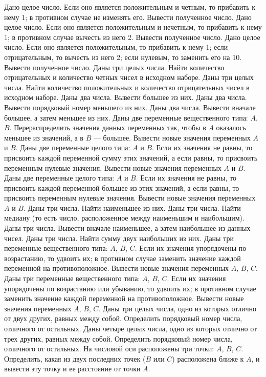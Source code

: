 Дано целое число. Если оно является положительным и четным, то прибавить к нему 1; в противном случае не изменять его. Вывести полученное число.
Дано целое число. Если оно является положительным и нечетным, то прибавить к нему 1; в противном случае вычесть из него 2. Вывести полученное число.
Дано целое число. Если оно является положительным, то прибавить к нему 1; если отрицательным, то вычесть из него 2; если нулевым, то заменить его на 10. Вывести полученное число.
Даны три целых числа. Найти количество отрицательных и количество четных чисел в исходном наборе.
Даны три целых числа. Найти количество положительных и количество отрицательных чисел в исходном наборе.
Даны два числа. Вывести большее из них.
Даны два числа. Вывести порядковый номер меньшего из них.
Даны два числа. Вывести вначале большее, а затем меньшее из них.
Даны две переменные вещественного типа: $A$, $B$. Перераспределить значения данных переменных так, чтобы в $A$ оказалось меньшее из значений, а в $B$ --- большее. Вывести новые значения переменных $A$ и $B$.
Даны две переменные целого типа: $A$ и $B$. Если их значения не равны, то присвоить каждой переменной сумму этих значений, а если равны, то присвоить переменным нулевые значения. Вывести новые значения переменных $A$ и $B$.
Даны две переменные целого типа: $A$ и $B$. Если их значения не равны, то присвоить каждой переменной большее из этих значений, а если равны, то присвоить переменным нулевые значения. Вывести новые значения переменных $A$ и $B$.
Даны три числа. Найти наименьшее из них.
Даны три числа. Найти медиану (то есть число, расположенное между наименьшим и наибольшим).
Даны три числа. Вывести вначале наименьшее, а затем наибольшее из данных чисел.
Даны три числа. Найти сумму двух наибольших из них.
Даны три переменные вещественного типа: $A$, $B$, $C$. Если их значения упорядочены по возрастанию, то удвоить их; в противном случае заменить значение каждой переменной на противоположное. Вывести новые значения переменных $A$, $B$, $C$.
Даны три переменные вещественного типа: $A$, $B$, $C$. Если их значения упорядочены по возрастанию или убыванию, то удвоить их; в противном случае заменить значение каждой переменной на противоположное. Вывести новые значения переменных $A$, $B$, $C$.
Даны три целых числа, одно из которых отлично от двух других, равных между собой. Определить порядковый номер числа, отличного от остальных.
Даны четыре целых числа, одно из которых отлично от трех других, равных между собой. Определить порядковый номер числа, отличного от остальных.
На числовой оси расположены три точки: $A$, $B$, $C$. Определить, какая из двух последних точек ($B$ или $C$) расположена ближе к $A$, и вывести эту точку и ее расстояние от точки $A$.
